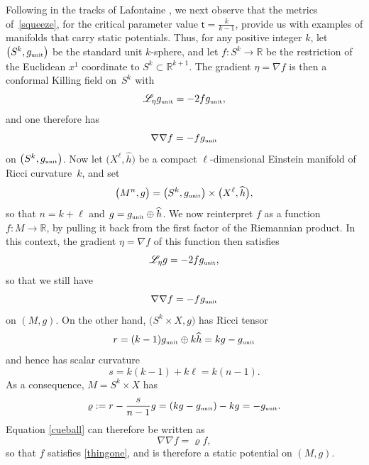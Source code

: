 \documentclass[pdftex]{sigma}
\numberwithin{equation}{section}
\def\RR{\mathbb{R}}
\begin{document}
Following in the tracks of Lafontaine \cite[Section~B]{lafontaine}, we next observe
that the metrics of~\eqref{squeeze}, for the critical parameter value $\mathsf{t}= \frac{k}{k-1}$,
provide us with examples of manifolds that carry static potentials.
Thus, for any positive integer $k$, let $\big(S^k, g_{\text{\tiny unit}}\big)$ be the standard
unit $k$-sphere, and let $f\colon S^k \to \RR$ be the restriction of the Euclidean $x^1$ coordinate to $S^k \subset \RR^{k+1}$.
The gradient $\eta= \nabla f$ is then a conformal Killing field on~$S^k$ with
\begin{equation*}
\mathscr{L}_\eta g_{\text{\tiny unit}} = -2f g_{\text{\tiny unit}},
\end{equation*}
and one therefore has
\begin{equation*}
\nabla \nabla f = - f g_{\text{\tiny unit}}
\end{equation*}
on $\big(S^k, g_{\text{\tiny unit}}\big)$. Now let $\big(X^{\ell}, \widehat{h}\big)$ be a compact $\ell$-dimensional Einstein manifold of Ricci curvature~$k$,
and set
\begin{equation*}
\big(M^{n}, g\big) = \big(S^k, g_{\text{\tiny unit}}\big) \times \big(X^\ell, \widehat{h}\big),
\end{equation*}
so that $n = k+\ell$ and $g=g_{\text{\tiny unit}} \oplus \widehat{h}$.
We now reinterpret $f$ as a function $f\colon M \to \RR$, by pulling it back from the first factor
of the Riemannian product. In this context, the gradient $\eta= \nabla f$ of this function
then satisfies
\begin{equation*}
\mathscr{L}_\eta g = -2f g_{\text{\tiny unit}},
\end{equation*}
so that we still have
\begin{equation}
\label{cueball}
\nabla \nabla f = - f g_{\text{\tiny unit}}
\end{equation}
on $(M, g)$. On the other hand, $\big(S^k \times X,g\big)$ has Ricci tensor
\begin{equation*}
r = (k-1) g_{\text{\tiny unit}} \oplus k \widehat{h}=kg-g_{\text{\tiny unit}}
\end{equation*}
and hence has scalar curvature
\begin{equation*}
s = k(k-1) + k\ell = k (n-1).
\end{equation*}
As a consequence, $M=S^k \times X$ has
\begin{equation*}
\varrho := r - \frac{s}{n-1}g= (k g - g_{\text{\tiny unit}}) - k g = -g_{\text{\tiny unit}}.
\end{equation*}
Equation \eqref{cueball} can therefore be written as
\begin{equation*}
\nabla \nabla f = \varrho f,
\end{equation*}
so that $f$ satisfies \eqref{thingone}, and is therefore a static potential on $(M,g)$.
\end{document}
